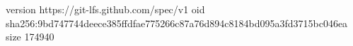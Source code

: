 version https://git-lfs.github.com/spec/v1
oid sha256:9bd747744deece385ffdfae775266c87a76d894c8184bd095a3fd3715bc046ea
size 174940
